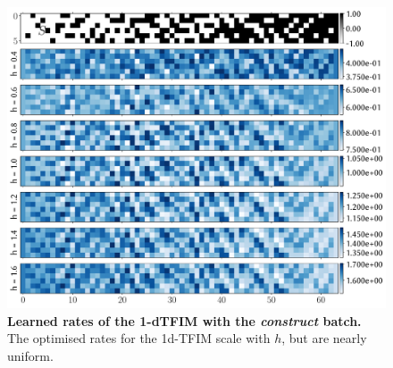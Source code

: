 \begin{figure}[t]
	\centering
	\includegraphics[width=1\linewidth]{Chapter5/Figs/Vector/troub_rates}
	\caption[Learned rates of the 1-dTFIM with the \emph{construct} batch]{\textbf{Learned rates of the 1-dTFIM with the \emph{construct} batch.} The optimised rates for the 1d-TFIM scale with $h$, but are nearly uniform. }
	\label{fig:troubrates}
\end{figure}

